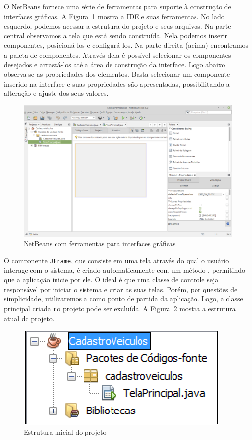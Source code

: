 O NetBeans fornece uma série de ferramentas para suporte à construção de interfaces gráficas. A Figura~\ref{fig:gui-netbeans} mostra a IDE e suas ferramentas. No lado esquerdo, podemos acessar a estrutura do projeto e seus arquivos. Na parte central observamos a tela que está sendo construída. Nela podemos inserir componentes, posicioná-los e configurá-los. Na parte direita (acima) encontramos a paleta de componentes. Através dela é possível selecionar os componentes desejados e arrastá-los até a área de construção da interface. Logo abaixo observa-se as propriedades dos elementos. Basta selecionar um componente inserido na interface e suas propriedades são apresentadas, possibilitando a alteração e ajuste dos seus valores.

\begin{figure}[h]
	\centering
	\includegraphics[width=0.6\textheight]{img/gui-netbeans}
	\caption{NetBeans com ferramentas para interfaces gráficas}
	\label{fig:gui-netbeans}
\end{figure}

O componente \texttt{JFrame}, que consiste em uma tela através do qual o usuário interage com o sistema, é criado automaticamente com um método , permitindo que a aplicação inicie por ele. O ideal é que uma classe de controle seja responsável por iniciar o sistema e criar as suas telas. Porém, por questões de simplicidade, utilizaremos a  como ponto de partida da aplicação. Logo, a classe principal criada no projeto pode ser excluída. A Figura~\ref{fig:gui-estrutura-inicial} mostra a estrutura atual do projeto.

\begin{figure}[h]
	\centering
	\includegraphics[width=0.4\textheight]{img/gui-estrutura-inicial}
	\caption{Estrutura inicial do projeto}
	\label{fig:gui-estrutura-inicial}
\end{figure}

